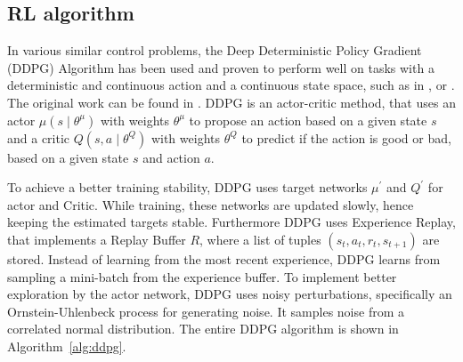 \documentclass[review]{elsarticle}
\providecommand{\martin}[1]{#1}                  %
\providecommand{\martinc}[1]{}                  %
\providecommand{\3}{{\ss}}
\begin{document}
  \subsection{\label{RL-algorithm}RL algorithm}
  In various similar control problems, the Deep Deterministic Policy
  Gradient (DDPG) Algorithm has been used and proven to perform well on
  tasks with a \martin{deterministic and} continuous action and a
  continuous state space, such as in
  \cite{SafeEfficientAndComfortable}, \cite{ComparisonRLvsMPC} or
  \cite{HumanLikeAutonomouCF}. The original work can be found in
  \cite{DDPG}. DDPG is an actor-critic method, that uses an actor
  $\mu\left(s \mid \theta^{\mu}\right)$ with weights $\theta^{\mu} $
  to propose an action based on a given state $s$ and a critic
  $Q\left(s, a \mid \theta^{Q}\right) $ with weights  $\theta^{Q}$ to
  predict if the action is good or bad, based on a given state $s$ and
  action $a$. \martinc{Ich w\"urde Subskripte f\"ur die Parameter(vektoren?)
  $\theta_{\mu}$ und $\theta_Q$ nehmen. Oder sind die Superskripte
    Konvention hier?}
\martinc{Ferner ist mir nicht klar, wie sich die
    Einleitung (Parameter des Aktions-Algorithmus bzw  Policy $\pi$ so w\"ahlen, dass der reward $R_t$
    maximiert wird) von der
    Actor-Critic Darstellung unterscheiden. F\"ur mich ist der Actor
    $\mu|\theta$ einfach der Algorithmus $\pi|\theta$ und die Critic die
    Rewardfunktion $R_t$, die als kumulierter Reward eigentlich keine im Lernprozess
    ver\"anderbaren Parameter hat, also alter Wein in neuen
    Schl\"auchen: Der Unterschied zu bzw. die Pr\"azisierung der
    Einleitung sollte klar werden, Au\3erdem, dass $\theta$ wohl den
    Vektor der Synapsenst\"arken/Linkst\"arken des jeweiligen NN angibt.)} 
To achieve a better training stability, DDPG uses target networks  $\mu^{\prime}$ and $Q^{\prime}$ for actor and Critic. While training, these networks are updated slowly, hence keeping the estimated targets stable. Furthermore DDPG uses Experience Replay, that implements a Replay Buffer $R$, where a list of tuples $\left(s_{t}, a_{t}, r_{t}, s_{t+1}\right)$ are stored. Instead of learning from the most recent experience, DDPG learns from sampling a mini-batch from the experience buffer. To implement better exploration by the actor network, DDPG uses noisy perturbations, specifically an Ornstein-Uhlenbeck process for generating noise. It samples noise from a correlated normal distribution. The entire DDPG algorithm is shown in Algorithm~\ref{alg:ddpg}. 
  
\end{document}
